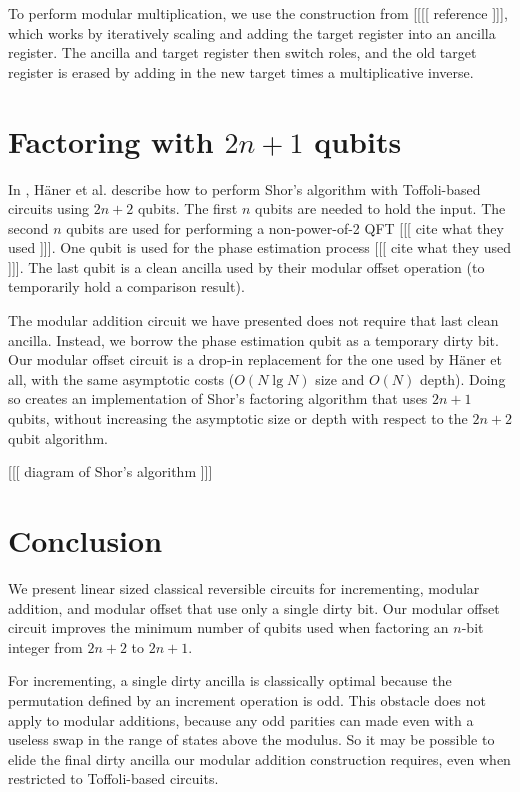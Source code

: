 \documentclass[twocolumn]{article}
\begin{document}
To perform modular multiplication, we use the construction from [[[[ reference ]]], which works by iteratively scaling and adding the target register into an ancilla register.
The ancilla and target register then switch roles, and the old target register is erased by adding in the new target times a  multiplicative inverse.

\section{Factoring with $2n+1$ qubits} \label{sec:applications} 

In \cite{haner2016}, H\"{a}ner et al. describe how to perform Shor's algorithm with Toffoli-based circuits using $2n+2$ qubits.
The first $n$ qubits are needed to hold the input.
The second $n$ qubits are used for performing a non-power-of-2 QFT [[[ cite what they used ]]].
One qubit is used for the phase estimation process [[[ cite what they used ]]].
The last qubit is a clean ancilla used by their modular offset operation (to temporarily hold a comparison result).

The modular addition circuit we have presented does not require that last clean ancilla.
Instead, we borrow the phase estimation qubit as a temporary dirty bit.
Our modular offset circuit is a drop-in replacement for the one used by H\"{a}ner et all, with the same asymptotic costs ($O(N \lg N)$ size and $O(N)$ depth).
Doing so creates an implementation of Shor's factoring algorithm that uses $2n+1$ qubits, without increasing the asymptotic size or depth with respect to the $2n+2$ qubit algorithm.

[[[ diagram of Shor's algorithm ]]]

\section{Conclusion} \label{sec:conclusion}

We present linear sized classical reversible circuits for incrementing, modular addition, and modular offset that use only a single dirty bit.
Our modular offset circuit improves the minimum number of qubits used when factoring an $n$-bit integer from $2n+2$ to $2n+1$.

For incrementing, a single dirty ancilla is classically optimal because the permutation defined by an increment operation is odd.
This obstacle does not apply to modular additions, because any odd parities can made even with a useless swap in the range of states above the modulus.
So it may be possible to elide the final dirty ancilla our modular addition construction requires, even when restricted to Toffoli-based circuits.
\end{document}

